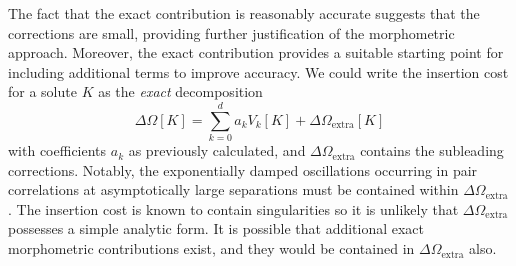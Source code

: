 \documentclass[11pt,twoside]{report}
\begin{document}
The fact that the exact contribution is reasonably accurate suggests that the corrections are small, providing further justification of the morphometric approach.
Moreover, the exact contribution provides a suitable starting point for including additional terms to improve accuracy.
We could write the insertion cost for a solute $K$ as the \emph{exact} decomposition
\begin{equation}\label{eq:exact-morph-decomposition}
  \Delta \Omega[K]
  =
  \sum_{k=0}^d a_k V_k[K]
  + \Delta \Omega_\mathrm{extra}[K]
\end{equation}
with coefficients $a_k$ as previously calculated, and $\Delta \Omega_\mathrm{extra}$ contains the subleading corrections.
Notably, the exponentially damped oscillations occurring in pair correlations at asymptotically large separations must be contained within $\Delta \Omega_\mathrm{extra}$.
The insertion cost is known to contain singularities%
so it is unlikely that $\Delta \Omega_\mathrm{extra}$ possesses a simple analytic form.
It is possible that additional exact morphometric contributions exist, and they would be contained in $\Delta \Omega_\mathrm{extra}$ also.
\end{document}
